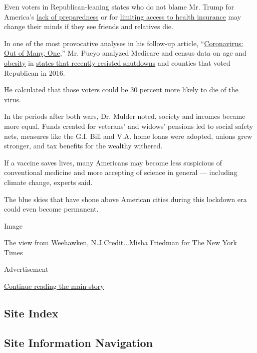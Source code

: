 Even voters in Republican-leaning states who do not blame Mr. Trump for
America's
\href{https://www.nytimes3xbfgragh.onion/2020/03/28/us/testing-coronavirus-pandemic.html}{lack
of preparedness} or for
\href{https://www.politico.com/news/2020/04/03/trump-obamacare-coronavirus-164285}{limiting
access to health insurance} may change their minds if they see friends
and relatives die.

In one of the most provocative analyses in his follow-up article,
``\href{https://medium.com/@tomaspueyo/coronavirus-out-of-many-one-36b886af37e9}{Coronavirus:
Out of Many, One},'' Mr. Pueyo analyzed Medicare and census data on age
and
\href{https://www.inverse.com/article/33016-trump-voters-more-likely-to-be-fat-no-college-education}{obesity}
in
\href{https://www.nytimes3xbfgragh.onion/2020/04/03/us/coronavirus-states-without-stay-home.html}{states
that recently resisted shutdowns} and counties that voted Republican in
2016.

He calculated that those voters could be 30 percent more likely to die
of the virus.

In the periods after both wars, Dr. Mulder noted, society and incomes
became more equal. Funds created for veterans' and widows' pensions led
to social safety nets, measures like the G.I. Bill and V.A. home loans
were adopted, unions grew stronger, and tax benefits for the wealthy
withered.

If a vaccine saves lives, many Americans may become less suspicious of
conventional medicine and more accepting of science in general ---
including climate change, experts said.

The blue skies that have shone above American cities during this
lockdown era could even become permanent.

Image

The view from Weehawken, N.J.Credit...Misha Friedman for The New York
Times

Advertisement

\protect\hyperlink{after-bottom}{Continue reading the main story}

\hypertarget{site-index}{%
\subsection{Site Index}\label{site-index}}

\hypertarget{site-information-navigation}{%
\subsection{Site Information
Navigation}\label{site-information-navigation}}

